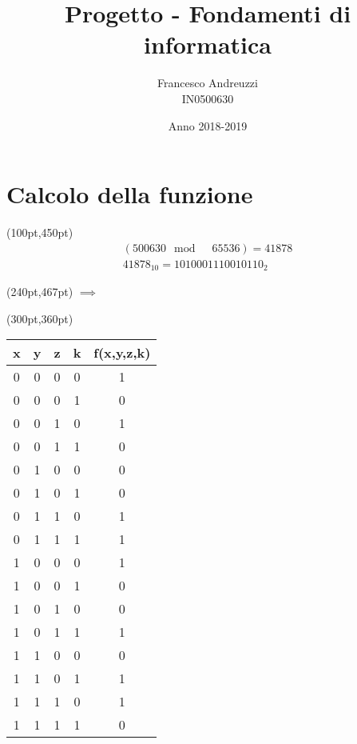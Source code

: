 \documentclass{article}
\begin{document}
\author{Francesco Andreuzzi\\ IN0500630}
\title{Progetto - Fondamenti di informatica}
\date{Anno 2018-2019}
\maketitle

\section{Calcolo della funzione}

\begin{textblock*}{10pt}(100pt,450pt)
  \begin{gather*}
    (500630 \mod \quad 65536) = 41878\\
    41878_{10} = 1010001110010110_2
  \end{gather*}
\end{textblock*}

\begin{textblock*}{10pt}(240pt,467pt)
  \Huge{$\implies$}
\end{textblock*}

\begin{textblock*}{10pt}(300pt,360pt)
  \begin{tabular}{|c|c|c|c|c|}
    \hline
    \textbf{x} & \textbf{y} & \textbf{z} & \textbf{k} & \textbf{f(x,y,z,k)} \\
    \hline
      0 & 0 & 0 & 0 & 1 \\
    \hline
      0 & 0 & 0 & 1 & 0 \\
    \hline
      0 & 0 & 1 & 0 & 1 \\
    \hline
      0 & 0 & 1 & 1 & 0 \\
    \hline
      0 & 1 & 0 & 0 & 0 \\
    \hline
      0 & 1 & 0 & 1 & 0 \\
    \hline
      0 & 1 & 1 & 0 & 1 \\
    \hline
      0 & 1 & 1 & 1 & 1 \\
    \hline
      1 & 0 & 0 & 0 & 1 \\
    \hline
      1 & 0 & 0 & 1 & 0 \\
    \hline
      1 & 0 & 1 & 0 & 0 \\
    \hline
      1 & 0 & 1 & 1 & 1 \\
    \hline
      1 & 1 & 0 & 0 & 0 \\
    \hline
      1 & 1 & 0 & 1 & 1 \\
    \hline
      1 & 1 & 1 & 0 & 1 \\
    \hline
      1 & 1 & 1 & 1 & 0 \\
    \hline
  \end{tabular}
\end{textblock*}
\end{document}
